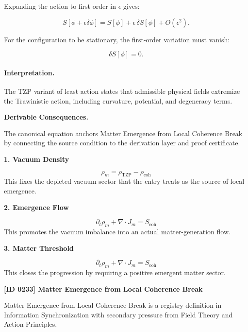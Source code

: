 Expanding the action to first order in $\epsilon$ gives:

\begin{equation}
S[\phi+\epsilon\delta\phi]
=
S[\phi]
+
\epsilon\,\delta S[\phi]
+
O(\epsilon^2).
\end{equation}

For the configuration to be stationary, the first-order variation must vanish:

\begin{equation}
\boxed{
\delta S[\phi]=0 .
}
\end{equation}

\paragraph{Interpretation.}
The TZP variant of least action states that admissible physical fields extremize the Trawinistic action, including curvature, potential, and degeneracy terms.

\par\vspace{0.35em}
\noindent\textbf{Derivable Consequences.}\quad
\begingroup
\footnotesize
\raggedright
The canonical equation anchors Matter Emergence from Local Coherence Break by connecting the source condition to the derivation layer and proof certificate.
\par\endgroup

\noindent\textbf{1. Vacuum Density}\par
\[
\rho_m=\rho_{\mathrm{TZP}}-\rho_{\mathrm{coh}}
\]
\noindent This fixes the depleted vacuum sector that the entry treats as the source of local emergence.\par
\noindent\textbf{2. Emergence Flow}\par
\[
\partial_t\rho_m+\nabla\cdot J_m=S_{\mathrm{coh}}
\]
\noindent This promotes the vacuum imbalance into an actual matter-generation flow.\par
\noindent\textbf{3. Matter Threshold}\par
\[
\partial_t\rho_m+\nabla\cdot J_m=S_{\mathrm{coh}}
\]
\noindent This closes the progression by requiring a positive emergent matter sector.\par

\clearpage
\noindent\textbf{[ID 0233] Matter Emergence from Local Coherence Break}\par
\vspace{0.35em}
\begingroup\small
{}
Matter Emergence from Local Coherence Break is a registry definition in Information Synchronization with secondary pressure from Field Theory and Action Principles.

